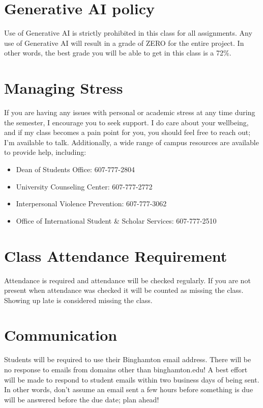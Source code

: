 \documentclass[11pt,article,oneside]{memoir} %
\begin{document}
\section{Generative AI policy}

Use of Generative AI is strictly prohibited in this class for all assignments.
Any use of Generative AI will result in a grade of ZERO for the entire project.
In other words, the best grade you will be able to get in this class is a 72\%.

\section{Managing Stress}

If you are having any issues with personal or academic stress at any time during the semester, I encourage you to seek support.
I do care about your wellbeing, and if my class becomes a pain point for you, you should feel free to reach out; I'm available to talk.
Additionally, a wide range of campus resources are available to provide help, including:
\begin{itemize}
    \item Dean of Students Office: 607-777-2804
    \item University Counseling Center: 607-777-2772
    \item Interpersonal Violence Prevention: 607-777-3062
    \item Office of International Student \& Scholar Services: 607-777-2510
\end{itemize}

\section{Class Attendance Requirement}

Attendance is required and attendance will be checked regularly.
If you are not present when attendance was checked it will be counted as missing the class.
Showing up late is considered missing the class.

\section{Communication}

Students will be required to use their Binghamton email address.
There will be no response to emails from domains other than binghamton.edu!
A best effort will be made to respond to student emails within two business days of being sent.
In other words, don't assume an email sent a few hours before something is due will be answered before the due date; plan ahead!
\end{document}
